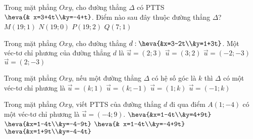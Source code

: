\begin{ex}%
	Trong mặt phẳng $Oxy$, cho đường thẳng $\Delta$ có PTTS $\heva{& x=3+4t\\&y=-4+t}$. Điểm nào sau đây thuộc đường thẳng $\Delta$?
	\choice
	{$M(19;1)$}
	{\True $N(19;0)$}
	{$P(19;2)$}
	{$Q(7;1)$}
\end{ex}

\begin{ex}%
	Trong mặt phẳng $Oxy$, cho đường thẳng $d: \heva{&x=3-2t\\&y=1+3t}$. Một véc-tơ chỉ phương của đường thẳng $d$ là
	\choice
	{$\overrightarrow{u} =(2;3)$}
	{$\overrightarrow{u} =(3;2)$}
	{$\overrightarrow{u} =(-2;-3)$}
	{\True $\overrightarrow{u} =(2;-3)$}
\end{ex}

\begin{ex}%
	Trong mặt phẳng $Oxy$, nếu một đường thẳng $\Delta $ có hệ số góc là $k$ thì $\Delta$ có một véc-tơ chỉ phương là
	\choice
	{$\overrightarrow{u}=(k;1)$}
	{$\overrightarrow{u}=(k;-1)$}
	{\True $\overrightarrow{u}=(1;k)$}
	{$\overrightarrow{u}=(-1;k)$}
\end{ex}

\begin{ex}%
	Trong mặt phẳng $Oxy$, viết PTTS của đường thẳng $d$ đi qua điểm $A(1;-4)$ có một véc-tơ chỉ phương là $\overrightarrow{u} =(-4;9)$.
	\choice
	{$\heva{&x=1-4t\\&y=4+9t}$}
	{$\heva{&x=1-4t\\&y=-4-9t}$}
	{\True $\heva{& x=1-4t\\&y=-4+9t}$}
	{$\heva{&x=1+9t\\&y=-4-4t}$}
\end{ex}

